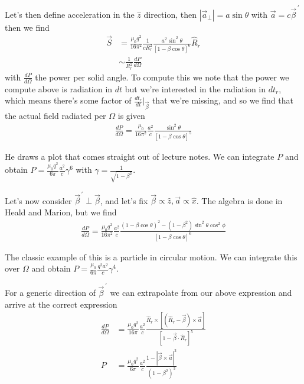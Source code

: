 \documentclass[10pt]{report}
\newcommand{\rd}[2]{\frac{d#1}{d#2}}
\newcommand{\pvec}[1]{\vec{#1}^{\,\prime}}
\newcommand{\abs}[1]{\left|#1\right|}
\begin{document}
Let's then define acceleration in the $\hat{z}$ direction, then $\abs{\vec{a}_{\perp}} = a\sin\theta$ with $\vec{a} = c\pvec{\beta}$ then we find
\begin{align}
    \vec{S} &= \frac{\mu_0 q^2}{16 \pi^2} \frac{1}{cR_r^2}\frac{a^2\sin^2\theta}{\left[ 1 - \beta \cos \theta \right]^6} \hat{R}_r\\
    &\sim \frac{1}{R_r^2}\rd{P}{\Omega}
\end{align}
with $\rd{P}{\Omega}$ the power per solid angle. To compute this we note that the power we compute above is radiation in $dt$ but we're interested in the radiation in $dt_r$, which means there's some factor of $\rd{t_r}{t}\Big|_{\vec{\beta}}$ that we're missing, and so we find that the actual field radiated per $\Omega$ is given
\begin{align}
    \rd{P}{\Omega} = \frac{\mu_0}{16\pi^2}\frac{a^2}{c}\frac{\sin^2\theta}{\left[ 1 - \beta \cos\theta \right]^{5}}
\end{align}

He draws a plot that comes straight out of lecture notes. We can integrate $P$ and obtain $P = \frac{\mu_0q^2}{6\pi}\frac{a^2}{c}\gamma^6$ with $\gamma = \frac{1}{\sqrt{1 - \beta^2}}$.

Let's now consider $\pvec{\beta} \perp \vec{\beta}$, and let's fix $\vec{\beta} \propto \hat{z}, \vec{a} \propto \hat{x}$. The algebra is done in Heald and Marion, but we find
\begin{align}
    \rd{P}{\Omega} = \frac{\mu_0 q^2}{16 \pi^2}\frac{a^2}{c}\frac{\left( 1 - \beta \cos\theta \right)^2 - \left( 1 - \beta^2 \right)\sin^2\theta\cos^2\phi}{\left[ 1 - \beta \cos \theta \right]^6}
\end{align}

The classic example of this is a particle in circular motion. We can integrate this over $\Omega$ and obtain $P = \frac{\mu_0}{6\pi}\frac{q^2a^2}{c}\gamma^4$.

For a generic direction of $\pvec{\beta}$ we can extrapolate from our above expression and arrive at the correct expression
\begin{align}
    \rd{P}{\Omega} &= \frac{\mu_0 q^2}{16\pi}\frac{a^2}{c}\frac{\hat{R}_r \times \left[ \left( \hat{R}_r - \vec{\beta} \right)\times \vec{a} \right]}{\left[ 1 - \vec{\beta} \cdot \hat{R}_r \right]^5}\\
    P &= \frac{\mu_0 q^2}{6\pi}\frac{a^2}{c}\frac{1 - \abs{\vec{\beta} \times \vec{a}}^2}{\left( 1 - \beta^2 \right)^3}
\end{align}
\end{document}
